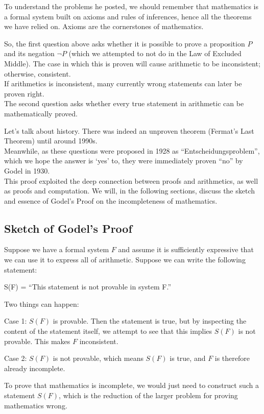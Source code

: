 To understand the problems he posted, we should remember that mathematics is a formal system built on axioms and rules of inferences, hence all the theorems we have relied on. Axioms are the cornerstones of mathematics.

So, the first question above asks whether it is possible to prove a proposition $P$ and its negation $\neg P$ (which we attempted to not do in the Law of Excluded Middle). The case in which this is proven will cause arithmetic to be inconsistent; otherwise, consistent. \\
If arithmetics is inconsistent, many currently wrong statements can later be proven right. \\
The second question asks whether every true statement in arithmetic can be mathematically proved.

Let's talk about history. There was indeed an unproven theorem (Fermat's Last Theorem) until around 1990s. \\
Meanwhile, as these questions were proposed in 1928 as ``Entscheidungsproblem'', which we hope the answer is `yes' to, they were immediately proven ``no'' by Godel in 1930. \\
This proof exploited the deep connection between proofs and arithmetics, as well as proofs and computation. We will, in the following sections, discuss the sketch and essence of Godel's Proof on the incompleteness of mathematics.

\subsection{Sketch of Godel's Proof}
Suppose we have a formal system $F$ and assume it is sufficiently expressive that we can use it to express all of arithmetic. Suppose we can write the following statement:
\begin{center}
    S(F) = ``This statement is not provable in system F.''
\end{center}
Two things can happen:
\begin{bindenum}
    \item {
        Case 1: $S(F)$ is provable. Then the statement is true, but by inspecting the content of the statement itself, we attempt to see that this implies $S(F)$ is not provable. This makes $F$ inconsistent.
    }
    \item {
        Case 2: $S(F)$ is not provable, which means $S(F)$ is true, and $F$ is therefore already incomplete.
    }
\end{bindenum}
To prove that mathematics is incomplete, we would just need to construct such a statement $S(F)$, which is the reduction of the larger problem for proving mathematics wrong.

